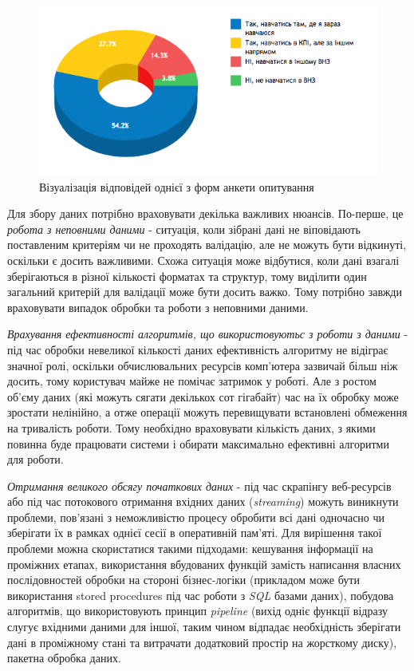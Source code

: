 \begin{figure}[h!]
  \includegraphics[width=\linewidth]{figures/answer_visualization.png}
  \caption{Візуалізація відповідей однієї з форм анкети опитування}
  \label{fig:answer_visualize}
\end{figure}

Для збору даних потрібно враховувати декілька важливих нюансів. По-перше, це \textit{робота з неповними даними} - ситуація, коли зібрані дані не віповідають поставленим критеріям чи не проходять валідацію, але не можуть бути відкинуті, оскільки є досить важливими. Схожа ситуація може відбутися, коли дані взагалі зберігаються в різної кількості форматах та структур, тому виділити один загальний критерій для валідації може бути досить важко. Тому потрібно завжди враховувати випадок обробки та роботи з неповними даними. 

\textit{Врахування ефективності алгоритмів, що використовуютьс з роботи з даними} - під час обробки невеликої кількості даних ефективність алгоритму не відіграє значної ролі, оскільки обчислювальних ресурсів комп'ютера зазвичай більш ніж досить, тому користувач майже не помічає затримок у роботі. Але з ростом об'єму даних (які можуть сягати декількох сот гігабайт) час на їх обробку може зростати нелінійно, а отже операції можуть перевищувати встановлені обмеження на тривалість роботи. Тому необхідно враховувати кількість даних, з якими повинна буде працювати системи і обирати максимально ефективні алгоритми для роботи.

\textit{Отримання великого обсягу початкових даних} - під час скрапінгу веб-ресурсів або під час потокового отримання вхідних даних (\textit{streaming}) можуть виникнути проблеми, пов'язані з неможливістю процесу обробити всі дані одночасно чи зберігати їх в рамках однієї сесії в оперативній пам'яті. Для вирішення такої проблеми можна скористатися такими підходами: кешування інформації на проміжних етапах, використання вбудованих функцій замість написання власних послідовностей обробки на стороні бізнес-логіки (прикладом може бути використання stored procedures під час роботи з \textit{SQL} базами даних), побудова алгоритмів, що використовують принцип \textit{pipeline} (вихід одніє функції відразу слугує вхідними даними для іншої, таким чином відпадає необхідність зберігати дані в проміжному стані та витрачати додатковий простір на жорсткому диску), пакетна обробка даних.

